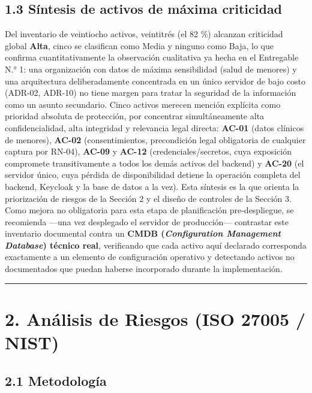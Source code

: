 \documentclass[11pt,a4paper]{article}
\begin{document}
\subsection{1.3 Síntesis de activos de máxima criticidad}\label{suxedntesis-de-activos-de-muxe1xima-criticidad}

Del inventario de veintiocho activos, veintitrés (el 82 \%) alcanzan criticidad global \textbf{Alta}, cinco se clasifican como Media y ninguno como Baja, lo que confirma cuantitativamente la observación cualitativa ya hecha en el Entregable N.° 1: una organización con datos de máxima sensibilidad (salud de menores) y una arquitectura deliberadamente concentrada en un único servidor de bajo costo (ADR-02, ADR-10) no tiene margen para tratar la seguridad de la información como un asunto secundario. Cinco activos merecen mención explícita como prioridad absoluta de protección, por concentrar simultáneamente alta confidencialidad, alta integridad y relevancia legal directa: \textbf{AC-01} (datos clínicos de menores), \textbf{AC-02} (consentimientos, precondición legal obligatoria de cualquier captura por RN-04), \textbf{AC-09} y \textbf{AC-12} (credenciales/secretos, cuya exposición compromete transitivamente a todos los demás activos del backend) y \textbf{AC-20} (el servidor único, cuya pérdida de disponibilidad detiene la operación completa del backend, Keycloak y la base de datos a la vez). Esta síntesis es la que orienta la priorización de riesgos de la Sección 2 y el diseño de controles de la Sección 3. Como mejora no obligatoria para esta etapa de planificación pre-despliegue, se recomienda ---una vez desplegado el servidor de producción--- contrastar este inventario documental contra un \textbf{CMDB (\emph{Configuration Management Database}) técnico real}, verificando que cada activo aquí declarado corresponda exactamente a un elemento de configuración operativo y detectando activos no documentados que puedan haberse incorporado durante la implementación.

\begin{center}\rule{0.5\linewidth}{0.5pt}\end{center}

\section{2. Análisis de Riesgos (ISO 27005 / NIST)}\label{anuxe1lisis-de-riesgos-iso-27005-nist}

\subsection{2.1 Metodología}\label{metodologuxeda}
\end{document}
